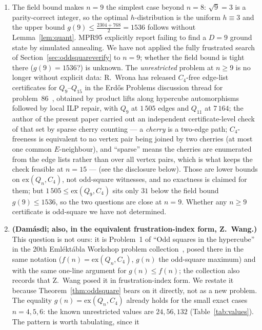 \documentclass[12pt]{article}
\newcommand{\ex}{\mathrm{ex}}
\begin{document}
\begin{enumerate}
  \item\label{op:n9} The field bound makes $n=9$ the simplest case beyond $n=8$:
    $\sqrt9=3$ is a parity-correct integer, so the optimal $h$-distribution
    is the uniform $h\equiv3$ and the upper bound $g(9)\le\tfrac{2304+768}{2}=1536$
    follows without Lemma~\ref{lem:quant}. MPR95 explicitly report failing to
    find a $D=9$ ground state by simulated annealing. We have not applied
    the fully frustrated search of Section~\ref{sec:oddsquareverify} to $n=9$;
    whether the field bound is tight there ($g(9)=1536$?) is unknown.
    The \emph{unrestricted} problem at $n\ge9$ is no longer without explicit
    data: R.~Wrona has released $C_4$-free edge-list certificates for
    $Q_9$--$Q_{15}$ in the Erd\H{o}s Problems discussion thread for
    problem~86~\cite{EP86}, obtained by product lifts along hypercube
    automorphisms followed by local ILP repair, with $Q_9$ at $1\,505$ edges
    and $Q_{11}$ at $7\,164$; the author of the present paper carried out an
    independent certificate-level check of that set by sparse cherry
    counting --- a \emph{cherry} is a two-edge path; $C_4$-freeness is
    equivalent to no vertex pair being joined by two cherries (at most
    one common $E$-neighbour), and ``sparse'' means the cherries are
    enumerated from the edge lists rather than over all vertex pairs,
    which is what keeps the check feasible at $n=15$ ---
    (see the disclosure below). Those are lower bounds on $\ex(Q_n,C_4)$, not
    odd-square witnesses, and no exactness is claimed for them; but
    $1\,505\le\ex(Q_9,C_4)$ sits only $31$ below the field bound
    $g(9)\le1536$, so the two questions are close at $n=9$. Whether any
    $n\ge9$ certificate is odd-square we have not determined.
  \item\label{op:equality} \textbf{(Dam\'asdi; also, in the equivalent
    frustration-index form, Z.~Wang.)} This question is not ours: it is
    Problem~1 of ``Odd squares in the hypercube'' in the 20th Emléktábla
    Workshop problem collection~\cite{Emlek26}, posed there in the same
    notation ($f(n)=\ex(Q_n,C_4)$, $g(n)$ the odd-square maximum) and with the
    same one-line argument for $g(n)\le f(n)$; the collection also records
    that Z.~Wang posed it in frustration-index form. We restate it because
    Theorem~\ref{thm:oddsquare} bears on it directly, not as a new problem.
    The equality $g(n)=\ex(Q_n,C_4)$ already holds for the small
    exact cases $n=4,5,6$: the known unrestricted values are $24,56,132$
    (Table~\ref{tab:values}). The pattern is worth tabulating, since it

\end{enumerate}
\end{document}
